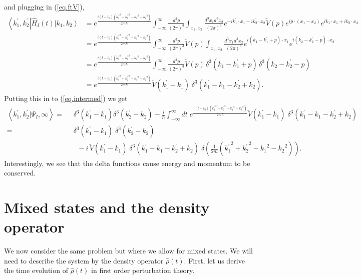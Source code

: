 \documentclass[11pt]{article}
\newcommand{\bra}[1]{\left\langle#1\right|}
\newcommand{\ket}[1]{\left|#1\right\rangle}
\newcommand{\braket}[2]{\left\langle#1|#2\right\rangle}
\newcommand{\op}[1]{\hat{#1}}
\theoremstyle{theorem}
\theoremstyle{remark}
\theoremstyle{step}
\theoremstyle{gap}
\begin{document}
and plugging in (\ref{eq.ftV}),
\begin{align*}
\bra{k_1^\prime, k_2^\prime} \op{H}_I(t)\ket{k_1, k_2} 
&= e^{\frac{i\left(t-t_0\right)\left({k_1^\prime}^2 + {k_2^\prime}^2 - {k_1}^2 - {k_2}^2\right)}{2m\hbar}} \int_{-\infty}^{\infty} \frac{d^3p}{(2\pi)^3}\int_{x_1, x_2} \frac{d^3 x_1 d^3 x_2}{(2\pi)^6}e^{-ik_1^\prime\cdot x_1 - ik_2^\prime\cdot x_2}\widetilde{V}(p)e^{ip\cdot(x_1-x_2)} e^{ik_1\cdot x_1 + ik_2\cdot x_2} \\
&= e^{\frac{i\left(t-t_0\right)\left({k_1^\prime}^2 + {k_2^\prime}^2 - {k_1}^2 - {k_2}^2\right)}{2m\hbar}} \int_{-\infty}^{\infty} \frac{d^3p}{(2\pi)^3}\widetilde{V}(p) \int_{x_1, x_2} \frac{d^3 x_1 d^3 x_2}{(2\pi)^6}e^{i(k_1-k_1^\prime+p)\cdot x_1}e^{i(k_2-k_2^\prime-p)\cdot x_2}\\
&= e^{\frac{i\left(t-t_0\right)\left({k_1^\prime}^2 + {k_2^\prime}^2 - {k_1}^2 - {k_2}^2\right)}{2m\hbar}} \int_{-\infty}^{\infty} \frac{d^3p}{(2\pi)^3}\widetilde{V}(p) \,\delta^3(k_1-k_1^\prime+p)\,\delta^3(k_2-k_2^\prime-p)\\
&= e^{\frac{i\left(t-t_0\right)\left({k_1^\prime}^2 + {k_2^\prime}^2 - {k_1}^2 - {k_2}^2\right)}{2m\hbar}} \widetilde{V}(k_1^\prime-k_1) \;\delta^3(k_1^\prime-k_1-k_2^\prime+k_2).
\end{align*}
Putting this in to (\ref{eq.intermed}) we get
\begin{align}
\braket{k_1^\prime, k_2^\prime}{\Psi_I, \infty} =&\;\; \delta^3(k_1^\prime - k_1)\delta^3(k_2^\prime - k_2) - \frac{i}{\hbar} \int_{-\infty}^\infty dt\;e^{\frac{i\left(t-t_0\right)\left({k_1^\prime}^2 + {k_2^\prime}^2 - {k_1}^2 - {k_2}^2\right)}{2m\hbar}} \widetilde{V}(k_1^\prime-k_1) \;\delta^3(k_1^\prime-k_1-k_2^\prime+k_2) \nonumber\\
=& \;\;\delta^3(k_1^\prime - k_1)\;\delta^3(k_2^\prime - k_2) \nonumber\\&\;\;\;\;- {i}\, \widetilde{V}(k_1^\prime-k_1) \;\delta^3(k_1^\prime-k_1-k_2^\prime+k_2) \;\delta\left(\frac{1}{{2m}}\left({k_1^\prime}^2 + {k_2^\prime}^2 - {k_1}^2 - {k_2}^2\right)\right).
\end{align}
Interestingly, we see that the delta functions cause energy and momentum to be conserved.

\section{Mixed states and the density operator}

We now consider the same problem but where we allow for mixed states. We will need to describe the system by the density operator \(\op{\rho}(t)\). First, let us derive the time evolution of \(\op{\rho}(t)\) in first order perturbation theory.
\end{document}
